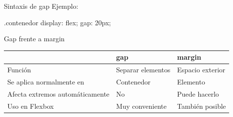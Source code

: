 \documentclass[aspectratio=169,11.5pt]{beamer}
\begin{document}
    \begin{frame}[fragile]{Sintaxis de gap}
        Ejemplo:

        \begin{csscodedark}
            .contenedor {
                display: flex;
                gap: 20px;
            }
        \end{csscodedark}

        \begin{center}
        \end{center}
    \end{frame}

    \begin{frame}{Gap frente a margin}
        \begin{center}
            \small
            \begin{tabular}{p{3cm}p{3.6cm}p{3.6cm}}
                \toprule
                & \textbf{gap} & \textbf{margin} \\
                \midrule

                Función &
                Separar elementos &
                Espacio exterior \\

                Se aplica normalmente en &
                Contenedor &
                Elemento \\

                Afecta extremos automáticamente &
                No &
                Puede hacerlo \\

                Uso en Flexbox &
                Muy conveniente &
                También posible \\

                \bottomrule
            \end{tabular}
        \end{center}
    \end{frame}
\end{document}
